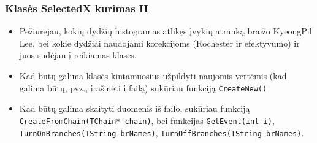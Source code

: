 \documentclass{beamer}
\begin{document}
\begin{frame}
\frametitle{Klasės SelectedX kūrimas II}
	
\begin{itemize}	
	\item Pežiūrėjau, kokių dydžių histogramas atlikęs įvykių atranką braižo KyeongPil Lee, bei kokie dydžiai naudojami korekcijoms (Rochester ir efektyvumo) ir juos sudėjau į reikiamas klases.
	\item Kad būtų galima klasės kintamuosius užpildyti naujomis vertėmis (kad galima būtų, pvz., įrašinėti į failą) sukūriau funkciją \texttt{CreateNew()}
	\item Kad būtų galima skaityti duomenis iš failo, sukūriau funkciją \texttt{CreateFromChain(TChain* chain)}, bei funkcijas \texttt{GetEvent(int i)}, \texttt{TurnOnBranches(TString brNames)}, \texttt{TurnOffBranches(TString brNames)}.
\end{itemize}

\end{frame}
\end{document}
